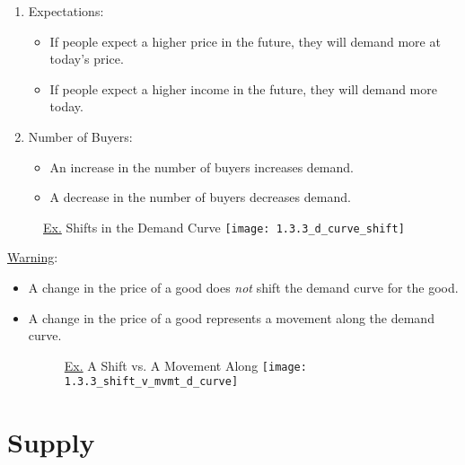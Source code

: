 \begin{enumerate}
\begin{itemize}
		\end{itemize}
		
	\item Expectations:
	
		\begin{itemize}
		
		\item If people expect a higher price in the future, they will demand more at today's price.
		
		\item If people expect a higher income in the future, they will demand more today. 
		
		\end{itemize}
		
	\item Number of Buyers:
	
		\begin{itemize}
		
		\item An increase in the number of buyers increases demand. 
		
		\item A decrease in the number of buyers decreases demand.
		
		\end{itemize}
	
	\end{enumerate}
	
	\begin{figure}[h]
	\underline{Ex.} Shifts in the Demand Curve
	\centering
	\texttt{[image: 1.3.3\_d\_curve\_shift]}
	\end{figure}
	
	\underline{Warning}:
	
	\begin{itemize}
	
	\item A change in the price of a good does \textit{not} shift the demand curve for the good.
	
	\item A change in the price of a good represents a movement along the demand curve.
	
	\begin{figure}[h]
	\underline{Ex.} A Shift vs. A Movement Along
	\centering
	\texttt{[image: 1.3.3\_shift\_v\_mvmt\_d\_curve]}
	\end{figure}
	
	\end{itemize}
	
\section{Supply}

